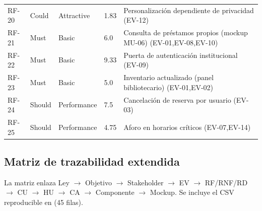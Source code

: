 \documentclass[12pt,journal,onecolumn]{IEEEtran}
\begin{document}
\begin{longtable}{P{0.10\textwidth}P{0.14\textwidth}P{0.14\textwidth}P{0.10\textwidth}P{0.42\textwidth}}
RF-20 & Could & Attractive & 1.83 & Personalización dependiente de privacidad (EV-12)\\
RF-21 & Must & Basic & 6.0 & Consulta de préstamos propios (mockup MU-06) (EV-01,EV-08,EV-10)\\
RF-22 & Must & Basic & 9.33 & Puerta de autenticación institucional (EV-09)\\
RF-23 & Must & Basic & 5.0 & Inventario actualizado (panel bibliotecario) (EV-01,EV-02)\\
RF-24 & Should & Performance & 7.5 & Cancelación de reserva por usuario (EV-03)\\
RF-25 & Should & Performance & 4.75 & Aforo en horarios críticos (EV-07,EV-14)\\
\bottomrule\end{longtable}

\subsection{Matriz de trazabilidad extendida}
La matriz enlaza Ley $\rightarrow$ Objetivo $\rightarrow$ Stakeholder $\rightarrow$ EV $\rightarrow$ RF/RNF/RD $\rightarrow$ CU $\rightarrow$ HU $\rightarrow$ CA $\rightarrow$ Componente $\rightarrow$ Mockup. Se incluye el CSV reproducible en  (45 filas).
\end{document}
